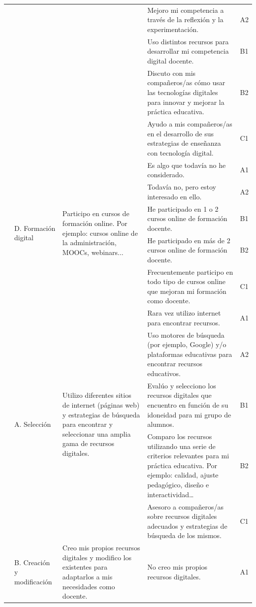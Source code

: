 \documentclass[spanish]{textolivre}
\begin{document}
\begin{small}
\begin{longtable}{
    >{\raggedright\arraybackslash}p{}
    p{}
    p{}
    p{}
    p{}
    }
\\
& & & Mejoro mi competencia a través de la reflexión y la experimentación. & A2
\\
& & & Uso distintos recursos para desarrollar mi competencia digital docente. & B1
\\
& & & Discuto con mis compañeros/as cómo usar las tecnologías digitales para innovar y mejorar la práctica educativa. & B2
\\
& & & Ayudo a mis compañeros/as en el desarrollo de sus estrategias de enseñanza con tecnología digital. & C1
\\
\cmidrule{2-5}
& \multirow{5}{=}{D. Formación digital} & \multirow{5}{=}{Participo en cursos de formación online. Por ejemplo: cursos online de la administración, MOOCs, webinars...} & Es algo que todavía no he considerado. & A1
\\
& & & Todavía no, pero estoy interesado en ello. & A2
\\
& & & He participado en 1 o 2 cursos online de formación docente. & B1
\\
& & & He participado en más de 2 cursos online de formación docente. & B2
\\
& & & Frecuentemente participo en todo tipo de cursos online que mejoran mi formación como docente. & C1
\\
\midrule
\multirow{15}{=}{2. Recursos digitales} & \multirow{5}{=}{A. Selección} & \multirow{5}{=}{Utilizo diferentes sitios de internet (páginas web) y estrategias de búsqueda para encontrar y seleccionar una amplia gama de recursos digitales.} & Rara vez utilizo internet para encontrar recursos. & A1
\\
& & & Uso motores de búsqueda (por ejemplo, Google) y/o plataformas educativas para encontrar recursos educativos. & A2
\\
& & & Evalúo y selecciono los recursos digitales que encuentro en función de su idoneidad para mi grupo de alumnos. & B1
\\
& & & Comparo los recursos utilizando una serie de criterios relevantes para mi práctica educativa. Por ejemplo: calidad, ajuste pedagógico, diseño e interactividad… & B2
\\
& & & Asesoro a compañeros/as sobre recursos digitales adecuados y estrategias de búsqueda de los mismos. & C1
\\
\cmidrule{2-5}
& \multirow{5}{=}{B. Creación y modificación} & \multirow{5}{=}{Creo mis propios recursos digitales y modifico los existentes para adaptarlos a mis necesidades como docente.} & No creo mis propios recursos digitales. & A1

\end{longtable}
\end{small}
\end{document}
